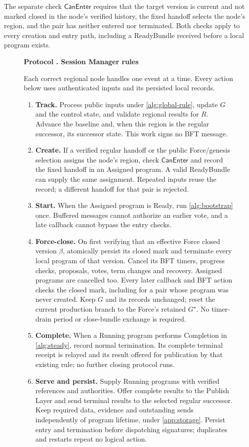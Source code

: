 \documentclass[11pt,a4paper]{article}
\newcommand{\tagg}[1]{\ensuremath{\mathsf{#1}}}
\newcounter{protocol}
\newenvironment{protocol}[3][htbp]{\begin{figure}[#1]\refstepcounter{protocol}\label{#2}
\begin{mdframed}[linewidth=.6pt,skipabove=0pt,skipbelow=0pt,
innertopmargin=7pt,innerbottommargin=7pt]\small
\textbf{Protocol \theprotocol. #3}\par\smallskip}{\end{mdframed}\end{figure}}
\begin{document}
\label{sec:can-enter}
The separate check $\tagg{CanEnter}$ requires that the target version
is current and not marked closed in the node's verified history,
the fixed handoff selects the node's region, and the pair has neither
entered nor terminated. Both checks apply to every creation and entry
path, including a ReadyBundle received before a local program exists.

\begin{protocol}[H]{alg:rotation}{Session Manager rules}
Each correct regional node handles one event at a time. Every action
below uses authenticated inputs and its persisted local records.
\begin{enumerate}[label=\textbf{\arabic*)},itemsep=3pt]
\item \textbf{Track.} Process public inputs under
\cref{alg:global-rule}, update $G$ and the control state, and validate
regional results for $R$. Advance the baseline and, when this region is
the regular successor, its successor state. This work signs no BFT
message.
\item \textbf{Create.} If a verified regular handoff or the public
Force/genesis selection assigns the node's region, check
\tagg{CanEnter} and record the fixed handoff in an Assigned program.
A valid ReadyBundle can supply the same assignment. Repeated inputs
reuse the record; a different handoff for that pair is rejected.
\item \textbf{Start.} When the Assigned program is Ready, run
\cref{alg:bootstrap} once. Buffered messages cannot authorize an earlier
vote, and a late callback cannot bypass the entry checks.
\item \textbf{Force-close.} On first verifying that an effective Force closed
version $\beta$, atomically persist its closed mark and terminate every
local program of that version. Cancel its BFT timers, progress checks,
proposals, votes, term changes and recovery. Assigned programs are
cancelled too. Every later callback and BFT action checks the closed
mark, including for a pair whose program was never created. Keep $G$
and its records unchanged; reset the current production branch to the
Force's retained $G^\star$. No timer-drain period or close-bundle
exchange is required.
\item \textbf{Complete.} When a Running program performs Completion in
\cref{alg:steady}, record normal termination. Its complete terminal
receipt is relayed and its result offered for publication by that
existing rule; no further closing protocol runs.
\item \textbf{Serve and persist.} Supply Running programs with verified
references and authorities. Offer complete results to the Publish Layer
and send terminal results to the selected regular successor. Keep
required data, evidence and outstanding sends independently of program
lifetime, under \cref{app:storage}. Persist entry and termination before
dispatching signatures; duplicates and restarts repeat no logical action.
\end{enumerate}
\end{protocol}
\end{document}
